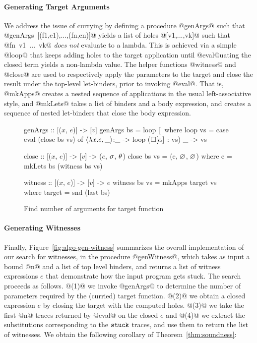 \paragraph{Generating Target Arguments}
%
We address the issue of currying by defining a procedure @genArgs@ such that \\
\hbox{@genArgs [(f1,e1),...,(fn,en)]@} yields a list of holes @[v1,...,vk]@
such that \hbox{@fn v1 ... vk@} \emph{does not} evaluate to a lambda.
%
This is achieved via a simple @loop@ that keeps adding holes to the
target application until @eval@uating the closed term yields a
non-lambda value.
%
The helper functions @witness@ and @close@ are used to respectively
apply the parameters to the target and close the result under the top-level
let-binders, prior to invoking \hbox{@eval@.}
%
That is, @mkApps@ creates a nested sequence of applications in
the usual left-associative style, and @mkLets@ takes a list of
binders and a body expression, and creates a sequence of nested
let-binders that close the body expression.

\begin{figure}[t]
\centering
\begin{mcode}
genArgs :: [($x$, $e$)] -> [$v$]
genArgs bs = loop []
  where
  loop vs  = case eval (close bs vs) of
               $\langle \lambda x. e, \_ \rangle$:_ -> loop ($\square[\alpha]$ : vs)
               _        -> vs

close :: [($x$, $e$)] -> [$v$] -> ($e$, $\sigma$, $\theta$)
close bs vs = (e, $\varnothing$, $\varnothing$)
  where
    e       = mkLets bs (witness bs vs)

witness :: [($x$, $e$)] -> [$v$] -> $e$
witness bs vs = mkApps target vs
  where
    target    = snd (last bs)
\end{mcode}
\caption{Find number of arguments for target function}
\label{fig:algo-gen-args}
\end{figure}


\paragraph{Generating Witnesses}
%
Finally, Figure~\ref{fig:algo-gen-witness} summarizes the overall
implementation of our search for witnesses, in the procedure @genWitness@,
which takes as input a bound @n@ and a list of top level binders, and
returns a list of witness expressions $e$ that demonstrate how the input
program gets stuck.
%
The search proceeds as follows.
%
@(1)@ we invoke @genArgs@ to determine the number of parameters required
by the (curried) target function.
%
@(2)@ we obtain a closed expression $e$ by closing the target with the
computed holes.
%
@(3)@ we take the first @n@ traces returned by @eval@ on the closed $e$
and
@(4)@ we extract the substitutions corresponding to the $\mathtt{stuck}$ traces,
and use them to return the list of witnesses.
%
We obtain the following corollary of Theorem~\ref{thm:soundness}:

